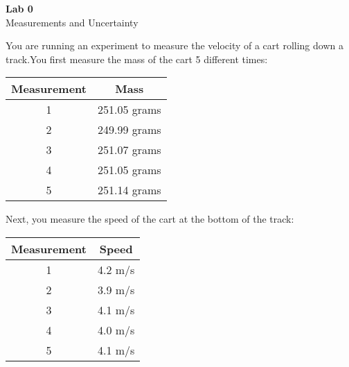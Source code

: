 \documentclass{article}
\begin{document}
\fancyfoot[C]{\thepage}
\vspace*{0cm}
\begin{center}
	{\LARGE \textbf{Lab 0}}\\
	\vspace{.25cm}
	{\Large Measurements and Uncertainty}
\end{center}

You are running an experiment to measure the velocity of a cart rolling down a track.You first measure the mass of the cart 5 different times:

\begin{center}
	\begin{tabular}{|c|c|}
		\hline
		Measurement & Mass \\
		\hline
		1 & 251.05 grams \\
		\hline
		2 & 249.99 grams \\
		\hline
		3 & 251.07 grams \\
		\hline
		4 & 251.05 grams \\
		\hline 
		5 & 251.14 grams \\
		\hline
	\end{tabular}
\end{center}

Next, you measure the speed of the cart at the bottom of the track:

\begin{center}
	\begin{tabular}{|c|c|}
		\hline
		Measurement & Speed \\
		\hline
		1 & 4.2 m/s \\
		\hline
		2 & 3.9 m/s \\
		\hline
		3 & 4.1 m/s\\
		\hline
		4 & 4.0 m/s\\
		\hline 
		5 & 4.1 m/s\\
		\hline
	\end{tabular}
\end{center}
\end{document}
